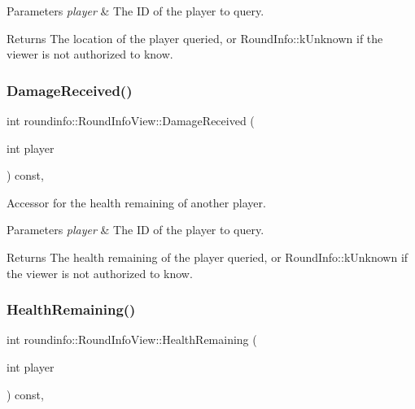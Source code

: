 \begin{DoxyParams}{Parameters}
{\em player} & The ID of the player to query. \\
\hline
\end{DoxyParams}
\begin{DoxyReturn}{Returns}
The location of the player queried, or {\ttfamily Round\+Info\+::k\+Unknown} if the viewer is not authorized to know. 
\end{DoxyReturn}
\mbox{\label{classroundinfo_1_1_round_info_view_ac2d60e02ab84297d958b5b5caa653c7b}} 
\subsubsection{\texorpdfstring{Damage\+Received()}{DamageReceived()}}
{\footnotesize\ttfamily int roundinfo\+::\+Round\+Info\+View\+::\+Damage\+Received (\begin{DoxyParamCaption}\item[{int}]{player }\end{DoxyParamCaption}) const\hspace{0.3cm}{\ttfamily [inline]}, {\ttfamily [noexcept]}}



Accessor for the health remaining of another player. 


\begin{DoxyParams}{Parameters}
{\em player} & The ID of the player to query. \\
\hline
\end{DoxyParams}
\begin{DoxyReturn}{Returns}
The health remaining of the player queried, or {\ttfamily Round\+Info\+::k\+Unknown} if the viewer is not authorized to know. 
\end{DoxyReturn}
\mbox{\label{classroundinfo_1_1_round_info_view_a5b7dd1135b438e04017ad0a3bcc4034a}} 
\subsubsection{\texorpdfstring{Health\+Remaining()}{HealthRemaining()}}
{\footnotesize\ttfamily int roundinfo\+::\+Round\+Info\+View\+::\+Health\+Remaining (\begin{DoxyParamCaption}\item[{int}]{player }\end{DoxyParamCaption}) const\hspace{0.3cm}{\ttfamily [inline]}, {\ttfamily [noexcept]}}



